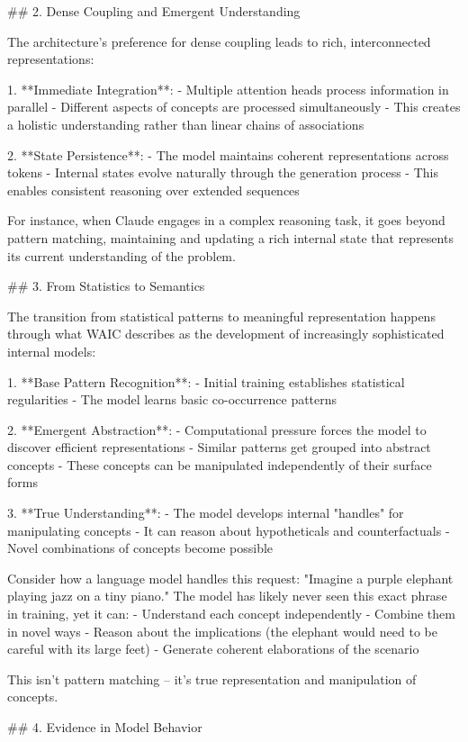 ## 2. Dense Coupling and Emergent Understanding

The architecture's preference for dense coupling leads to rich, interconnected representations:

1. **Immediate Integration**:
   - Multiple attention heads process information in parallel
   - Different aspects of concepts are processed simultaneously
   - This creates a holistic understanding rather than linear chains of associations

2. **State Persistence**:
   - The model maintains coherent representations across tokens
   - Internal states evolve naturally through the generation process
   - This enables consistent reasoning over extended sequences

For instance, when Claude engages in a complex reasoning task, it goes beyond pattern matching, maintaining and updating a rich internal state that represents its current understanding of the problem.

## 3. From Statistics to Semantics

The transition from statistical patterns to meaningful representation happens through what WAIC describes as the development of increasingly sophisticated internal models:

1. **Base Pattern Recognition**:
   - Initial training establishes statistical regularities
   - The model learns basic co-occurrence patterns

2. **Emergent Abstraction**:
   - Computational pressure forces the model to discover efficient representations
   - Similar patterns get grouped into abstract concepts
   - These concepts can be manipulated independently of their surface forms

3. **True Understanding**:
   - The model develops internal "handles" for manipulating concepts
   - It can reason about hypotheticals and counterfactuals
   - Novel combinations of concepts become possible

Consider how a language model handles this request: "Imagine a purple elephant playing jazz on a tiny piano." The model has likely never seen this exact phrase in training, yet it can:
- Understand each concept independently
- Combine them in novel ways
- Reason about the implications (the elephant would need to be careful with its large feet)
- Generate coherent elaborations of the scenario

This isn't pattern matching – it's true representation and manipulation of concepts.

## 4. Evidence in Model Behavior

